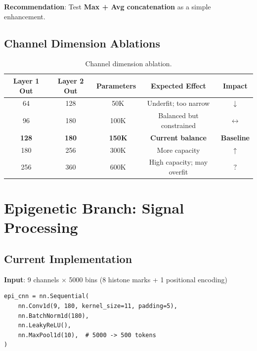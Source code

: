 \documentclass[11pt,a4paper]{article}
\begin{document}
\textbf{Recommendation}: Test \textbf{Max + Avg concatenation} as a simple enhancement.

\subsection{Channel Dimension Ablations}

\begin{table}[H]
\centering
\begin{tabular}{ccccc}
\toprule
\textbf{Layer 1 Out} & \textbf{Layer 2 Out} & \textbf{Parameters} & \textbf{Expected Effect} & \textbf{Impact} \\
\midrule
64 & 128 & ~50K & Underfit; too narrow & \textcolor{negative}{$\downarrow$} \\
96 & 180 & ~100K & Balanced but constrained & \textcolor{neutral}{$\leftrightarrow$} \\
\rowcolor{lightgray}
\textbf{128} & \textbf{180} & \textbf{~150K} & \textbf{Current balance} & \textbf{Baseline} \\
180 & 256 & ~300K & More capacity & \textcolor{positive}{$\uparrow$} \\
256 & 360 & ~600K & High capacity; may overfit & \textcolor{uncertain}{$?$} \\
\bottomrule
\end{tabular}
\caption{Channel dimension ablation.}
\end{table}

\section{Epigenetic Branch: Signal Processing}

\subsection{Current Implementation}

\textbf{Input}: 9 channels $\times$ 5000 bins (8 histone marks + 1 positional encoding)

\begin{verbatim}
epi_cnn = nn.Sequential(
    nn.Conv1d(9, 180, kernel_size=11, padding=5),
    nn.BatchNorm1d(180),
    nn.LeakyReLU(),
    nn.MaxPool1d(10),  # 5000 -> 500 tokens
)
\end{verbatim}
\end{document}
